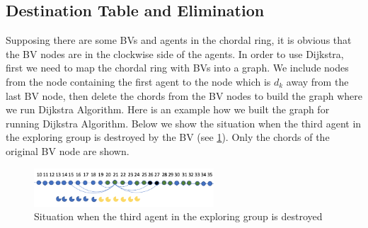 \subsection{Destination Table and Elimination}
Supposing there are some BVs and agents in the chordal ring, it is obvious that the BV nodes are in the clockwise side of the agents. In order to use Dijkstra, first we need to map the chordal ring with BVs into a graph. We include nodes from the node containing the first agent to the node which is $d_k$ away from the last BV node, then delete the chords from the BV nodes to build the graph where we run Dijkstra Algorithm.
Here is an example how we built the graph for running Dijkstra Algorithm. Below we show the situation when the third agent in the exploring group is destroyed by the BV (see \ref{fig:D1}). Only the chords of the original BV node are shown. 
\begin{figure}[H]
  \centering  
  \includegraphics[width=0.6\textwidth]{figures/D1.png}
  \caption{Situation when the third agent in the exploring group is destroyed}\label{fig:D1}
\end{figure} 

